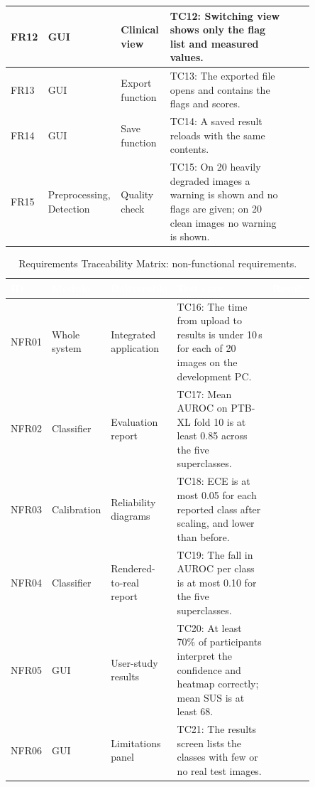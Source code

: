 \begin{table}[H]
\begin{tabular}{|p{0.07\linewidth}|p{0.15\linewidth}|p{0.16\linewidth}|p{0.39\linewidth}|p{0.08\linewidth}|}
    \hline
    FR12 & GUI & Clinical view & TC12: Switching view shows only the flag list and measured values. & \\
    \hline
    FR13 & GUI & Export function & TC13: The exported file opens and contains the flags and scores. & \\
    \hline
    FR14 & GUI & Save function & TC14: A saved result reloads with the same contents. & \\
    \hline
    FR15 & Preprocessing, Detection & Quality check & TC15: On 20 heavily degraded images a warning is shown and no flags are given; on 20 clean images no warning is shown. & \\
    \hline
  \end{tabular}
\end{table}

\begin{table}[H]
  \centering
  \footnotesize
  \setlength{\arrayrulewidth}{0.8pt}
  \renewcommand{\arraystretch}{1.25}
  \caption{Requirements Traceability Matrix: non-functional requirements.}
  \label{tab:rtm-nfr}
  \begin{tabular}{|p{0.07\linewidth}|p{0.15\linewidth}|p{0.16\linewidth}|p{0.39\linewidth}|p{0.08\linewidth}|}
    \hline
    \rowcolor{cyan!90!black}
    \textcolor{white}{\textbf{ID}} & \textcolor{white}{\textbf{Module}} &
    \textcolor{white}{\textbf{Deliverable}} & \textcolor{white}{\textbf{Test case}} &
    \textcolor{white}{\textbf{Result}} \\
    \hline
    NFR01 & Whole system & Integrated application & TC16: The time from upload to results is under 10\,s for each of 20 images on the development PC. & \\
    \hline
    NFR02 & Classifier & Evaluation report & TC17: Mean AUROC on PTB-XL fold 10 is at least 0.85 across the five superclasses. & \\
    \hline
    NFR03 & Calibration & Reliability diagrams & TC18: ECE is at most 0.05 for each reported class after scaling, and lower than before. & \\
    \hline
    NFR04 & Classifier & Rendered-to-real report & TC19: The fall in AUROC per class is at most 0.10 for the five superclasses. & \\
    \hline
    NFR05 & GUI & User-study results & TC20: At least 70\% of participants interpret the confidence and heatmap correctly; mean SUS is at least 68. & \\
    \hline
    NFR06 & GUI & Limitations panel & TC21: The results screen lists the classes with few or no real test images. & \\

\end{tabular}
\end{table}
